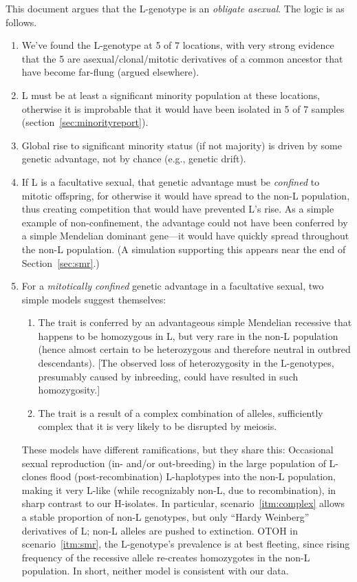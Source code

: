 \documentclass{article}\usepackage[]{graphicx}\usepackage[]{color}
\begin{document}
This document argues that the L-genotype is an \emph{obligate asexual}.  The logic is as follows.
\begin{enumerate}
  \item We've found the L-genotype at 5 of 7 locations, with very strong evidence that the 5 are
    asexual/clonal/mitotic derivatives of a common ancestor that have become far-flung (argued
    elsewhere).

  \item L must be at least a significant minority population at these locations, otherwise it is
    improbable that it would have been isolated in 5 of 7 samples (section~\ref{sec:minorityreport}).

  \item Global rise to significant minority status (if not majority) is driven by some genetic
    advantage, not by chance (e.g., genetic drift).
  
  \item If L is a facultative sexual, that genetic advantage must be \emph{confined} to mitotic
    offspring, for otherwise it would have spread to the non-L population, thus creating competition
    that would have prevented L's rise.  As a simple example of non-confinement, the advantage could
    not have been conferred by a simple Mendelian dominant gene---it would have quickly spread
    throughout the non-L population.  (A simulation supporting this appears near the end of
    Section~\ref{sec:smr}.)

  \item For a \emph{mitotically confined} genetic advantage in a facultative sexual, two simple
    models suggest themselves:
    \begin{enumerate}
      \item\label{itm:smr} The trait is conferred by an advantageous simple Mendelian recessive that
        happens to be homozygous in L, but very rare in the non-L population (hence almost certain
        to be heterozygous and therefore neutral in outbred descendants).  [The observed loss of
        heterozygosity in the L-genotypes, presumably caused by inbreeding, could have resulted in
        such homozygosity.]
      \item\label{itm:complex} The trait is a result of a complex combination of alleles,
        sufficiently complex that it is very likely to be disrupted by meiosis.
    \end{enumerate}
    These models have different ramifications, but they share this: Occasional sexual reproduction
    (in- and/or out-breeding) in the large population of L-clones flood (post-recombination)
    L-haplotypes into the non-L population, making it very L-like (while recognizably non-L, due to
    recombination), in sharp contrast to our H-isolates.  In particular, scenario~\ref{itm:complex}
    allows a stable proportion of non-L genotypes, but only ``Hardy Weinberg'' derivatives of L;
    non-L alleles are pushed to extinction.  OTOH in scenario~\ref{itm:smr}, the L-genotype's
    prevalence is at best fleeting, since rising frequency of the recessive allele re-creates
    homozygotes in the non-L population.  In short, neither model is consistent with our data.
\end{enumerate}
\end{document}
